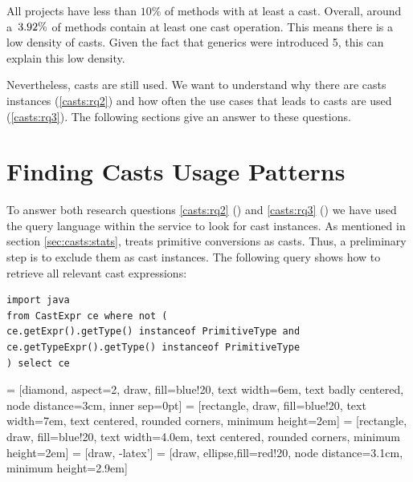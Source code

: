 All projects have less than $10\%$ of methods with at least a cast.
Overall, around a~$3.92\%{}$ of methods contain at least one cast operation. 
This means there is a low density of casts.
Given the fact that generics were introduced \java{} 5, this can explain this low density.

Nevertheless, casts are still used.
We want to understand why there are casts instances (\ref{casts:rq2}) and
how often the use cases that leads to casts are used (\ref{casts:rq3}).
The following sections give an answer to these questions.


\section{Finding Casts Usage Patterns}
\label{sec:casts:methodology}

To answer both research questions
\ref{casts:rq2} (\emph{\crqB}) and \ref{casts:rq3} (\emph{\crqC})
we have used the \ql{} query language within the \lgtm{} service to look for cast instances.
%
As mentioned in section \ref{sec:casts:stats}, \ql{} treats primitive conversions as casts.
Thus, a preliminary step is to exclude them as cast instances.
The following \ql{} query shows how to retrieve all relevant cast expressions:

\begin{lstlisting}[style=ql,caption=\ql{} query to retrieve all relevant cast expressions.]
import java
from CastExpr ce where not (
ce.getExpr().getType() instanceof PrimitiveType and
ce.getTypeExpr().getType() instanceof PrimitiveType
) select ce
\end{lstlisting}

 = [diamond, aspect=2, draw, fill=blue!20, 
    text width=6em, text badly centered, node distance=3cm, inner sep=0pt]
 = [rectangle, draw, fill=blue!20, 
    text width=7em, text centered, rounded corners, minimum height=2em]
 = [rectangle, draw, fill=blue!20, 
    text width=4.0em, text centered, rounded corners, minimum height=2em]
 = [draw, -latex']
 = [draw, ellipse,fill=red!20, node distance=3.1cm,
    minimum height=2.9em]

